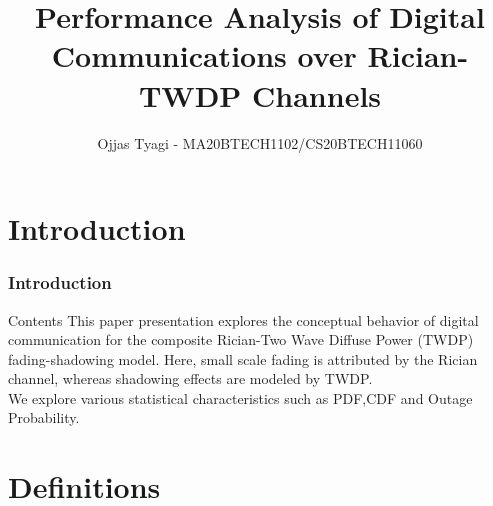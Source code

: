 \documentclass{beamer}
\title{Performance Analysis of Digital Communications over Rician-TWDP Channels}
\author{Ojjas Tyagi - MA20BTECH1102/CS20BTECH11060}
\begin{document}
\begin{frame}
\titlepage
\end{frame}
\section{Introduction}
\begin{frame}
\frametitle{Introduction}
\begin{block}{Contents}
This  paper presentation explores the  conceptual  behavior  of  digital  communication  for  the  composite  Rician-Two  Wave  Diffuse Power (TWDP) fading-shadowing model. Here, small scale  fading  is  attributed  by  the  Rician  channel,  whereas  shadowing  effects  are  modeled  by  TWDP.\\ We explore various statistical characteristics such as PDF,CDF and Outage Probability. 
\end{block}
\end{frame}
\section{Definitions}
\end{document}
